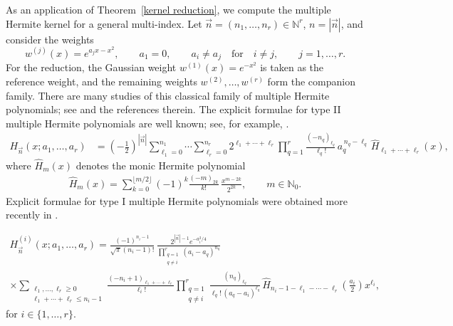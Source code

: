 \documentclass[a4paper,10pt,leqno]{amsart}
\numberwithin{equation}{section}
\theoremstyle{remark}
\begin{document}
 
As an application of Theorem~\ref{kernel reduction}, we compute the multiple Hermite kernel for a general multi-index. Let $\vec n =(n_1,\ldots,n_r)\in\mathbb N^r$, $n=|\vec n|$, and consider the weights
\begin{equation}\label{mult hermit weights}
    w^{(j)}(x)=e^{a_jx-x^2},\qquad a_1=0,\qquad a_i\neq a_j \quad \text{for} \quad i\neq j,\qquad j=1,\ldots,r .
\end{equation}
For the reduction, the Gaussian weight $w^{(1)}(x)=e^{-x^2}$ is taken as the reference weight, and the remaining weights $w^{(2)},\ldots,w^{(r)}$ form the companion family. There are many studies of this classical family of multiple Hermite polynomials; see \cite{ApBrVA,BleKuij-HerLag} and the references therein. The explicit formulae for type II multiple Hermite polynomials are well known; see, for example, \cite[Section~23.5]{Ismail}.
\begin{align} \label{HermiteTypeII} H_{\vec n}(x;a_1,\ldots,a_r) &= \left(-\frac{1}{2}\right)^{|\vec n|} \sum_{\ell_1=0}^{n_1}\cdots\sum_{\ell_r=0}^{n_r} 2^{\ell_1+\cdots+\ell_r} \prod_{q=1}^r \frac{(-n_q)_{\ell_q}}{\ell_q!}\, a_q^{\,n_q-\ell_q}\, \widehat{H}_{\ell_1+\cdots+\ell_r}(x), \end{align} 
where $\widehat{H}_m(x)$ denotes the monic Hermite polynomial \begin{align} \label{HermiteMonic} \widehat{H}_m(x)= \sum_{k=0}^{\lfloor m/2\rfloor} (-1)^k \frac{(-m)_{2k}}{k!}\, \frac{x^{m-2k}}{2^{2k}}, \qquad m\in\mathbb N_0 .
\end{align}
Explicit formulae for type I multiple Hermite polynomials were obtained more recently in \cite{BranquinhoDiazFoulquieMorenoManas2025}.
 
\begin{multline}
\label{HermiteTypeI}
H^{(i)}_{\vec n}(x;a_1,\ldots,a_r)
=
\frac{(-1)^{n_i-1}}{\sqrt{\pi}(n_i-1)!}\,
\frac{2^{|\vec n|-1}e^{-a_i^2/4}}
{\prod_{\substack{q=1\\ q\neq i}}^r (a_i-a_q)^{n_q}}
\\
\times
\sum_{\substack{\ell_1,\ldots,\ell_r\ge 0\\
\ell_1+\cdots+\ell_r\le n_i-1}}
\frac{(-n_i+1)_{\ell_1+\cdots+\ell_r}}{\ell_i!}
\prod_{\substack{q=1\\ q\neq i}}^r
\frac{(n_q)_{\ell_q}}
{\ell_q!\,(a_q-a_i)^{\ell_q}}\,
\widehat{H}_{n_i-1-\ell_1-\cdots-\ell_r}\!\left(\frac{a_i}{2}\right)
x^{\ell_i},
\end{multline}
 for $i\in\{1,\ldots,r\}$.
\end{document}
